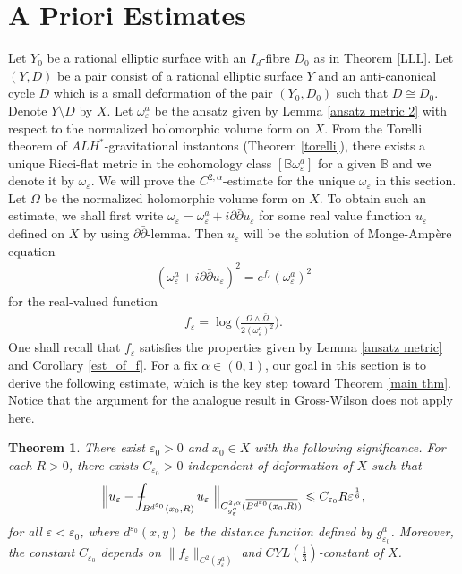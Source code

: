 \documentclass[11pt]{amsart}
\theoremstyle{plain}
\newtheorem{thm}{Theorem}[section]
\theoremstyle{definition}
\numberwithin{equation}{section}
\renewcommand{\leq}{\leqslant}
\renewcommand{\epsilon}{\varepsilon}
\def\Xint#1{\mathchoice
   {\XXint\displaystyle\textstyle{#1}}%
   {\XXint\textstyle\scriptstyle{#1}}%
   {\XXint\scriptstyle\scriptscriptstyle{#1}}%
   {\XXint\scriptscriptstyle\scriptscriptstyle{#1}}%
   \!\int}
\def\XXint#1#2#3{{\setbox0=\hbox{$#1{#2#3}{\int}$}
     \vcenter{\hbox{$#2#3$}}\kern-.5\wd0}}
\def\dashint{\Xint-}
\begin{document}
	





\section{A Priori Estimates} \label{sec: a priori}
Let $Y_0$ be a rational elliptic surface with an $I_d$-fibre $D_0$ as in Theorem \ref{LLL}. Let $(Y,D)$ be a pair consist of a rational elliptic surface $Y$ and an anti-canonical cycle $D$ which is a small deformation of the pair $(Y_0,D_0)$ such that $D\cong D_0$. Denote $Y\setminus D$ by $X$. 
Let $\omega^a_{\varepsilon}$ be the ansatz given by Lemma \ref{ansatz metric 2} with respect to the normalized holomorphic volume form on $X$.  
From the Torelli theorem of $ALH^*$-gravitational instantons (Theorem \ref{torelli}), there exists a unique Ricci-flat metric in the cohomology class $[\mathbb{B}\omega_{\epsilon}^a]$ for a given $\mathbb{B}$ and we denote it by $\omega_{\epsilon}$. We will prove the $C^{2,\alpha}$-estimate for the unique $\omega_{\varepsilon}$ in this section. Let $\Omega$ be the normalized holomorphic volume form on $X$. To obtain such an estimate, we shall first write $\omega_{\varepsilon}=\omega^a_{\varepsilon}+i\partial\bar{\partial}u_{\varepsilon}$ for some real value function $u_{\varepsilon}$ defined on $X$ by using $\partial\bar{\partial}$-lemma. Then $u_\varepsilon$ will be the solution of Monge-Amp\`ere equation
\begin{align}\label{MAeq}
(\omega^a_{\varepsilon}+i\partial\bar{\partial}u_{\varepsilon})^2=e^{f_{\varepsilon}}(\omega^a_{\varepsilon})^2
\end{align}
for the real-valued function 
\begin{align*}
f_{\varepsilon}=\log \bigg( \frac{\Omega\wedge\bar{\Omega}}{2(\omega^a_{\varepsilon})^2}\bigg).
\end{align*}
One shall recall that $f_{\varepsilon}$ satisfies the properties given by Lemma \ref{ansatz metric} and Corollary \ref{est_of_f}.
For a fix $\alpha\in (0,1)$, our goal in this section is to derive the following estimate, which is the key step toward Theorem \ref{main thm}. Notice that the argument for the analogue result in Gross-Wilson does not apply here. 
\begin{thm}\label{c2alpha} 
There exist $\epsilon_0>0$ and $x_0\in X$ with the following significance. For each $R>0$, there exists $C_{\epsilon_0}	>0$ independent of deformation of $X$ such that
\begin{align}
\Big\|u_{\varepsilon}-\dashint_{B^{d^{\varepsilon_0}}(x_0,R)}u_{\varepsilon}\ \Big\|_{C^{2,\alpha}_{g_{\varepsilon}^a}(\overline{B^{d^{\varepsilon_0}}(x_0,R)})}\leq C_{{\varepsilon_0}}R\varepsilon^{\frac{1}{6}},
\end{align}
for all $\varepsilon<\epsilon_0$, where  $d^{\varepsilon_0}(x,y)$ be the distance function defined by $g^a_{\varepsilon_0}$. Moreover, the constant $C_{\varepsilon_0}$ depends on $\|f_{\epsilon}\|_{C^2(g^a_{\epsilon})}$ and $CYL(\frac{1}{3})$-constant of $X$. 
\end{thm}
\end{document}
